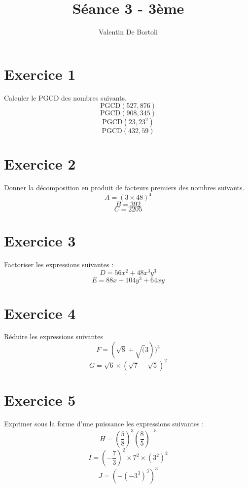 \documentclass[10pt,a4paper]{article}
\title{Séance 3 - 3ème}
\author{Valentin De Bortoli}
\begin{document}
\maketitle
\section{Exercice 1}
Calculer le PGCD des nombres suivants.
\begin{equation}
\text{PGCD}(527,876)
\end{equation}
\begin{equation}
\text{PGCD}(908,345)
\end{equation}
\begin{equation}
\text{PGCD}(23,23^2)
\end{equation}
\begin{equation}
\text{PGCD}(432,59)
\end{equation}
\section{Exercice 2}
Donner la décomposition en produit de facteurs premiers des nombres suivants.
\begin{equation}
A=(3 \times 48)^4
\end{equation}
\begin{equation}
B=392
\end{equation}
\begin{equation}
C=2205
\end{equation}
\section{Exercice 3}
Factoriser les expressions suivantes :
\begin{equation}
D=56x^2+48x^3y^3
\end{equation}
\begin{equation}
E=88x+104y^3+64xy
\end{equation}
\section{Exercice 4}
Réduire les expressions suivantes
\begin{equation}
F=(\sqrt{8}+\sqrt(3))^3
\end{equation}
\begin{equation}
G=\sqrt{6}\times (\sqrt{7}-\sqrt{5})^2
\end{equation}
\section{Exercice 5}
Exprimer sous la forme d'une puissance les expressions suivantes :
\begin{equation}
H=\left(\frac{5}{8}\right)^3\left(\frac{8}{5}\right)^{-5}
\end{equation}
\begin{equation}
I=\left(-\frac{7}{3}\right)^2\times 7^2 \times (3^2)^2
\end{equation}
\begin{equation}
J=(-(-3^3)^3)^3
\end{equation}
\end{document}
